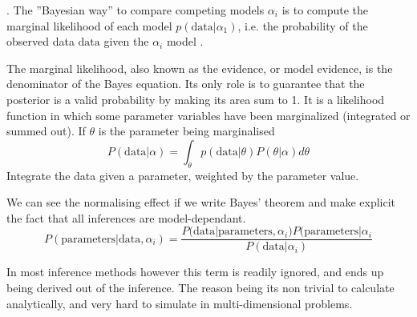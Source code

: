 .
The ''Bayesian way'' to compare competing models $\alpha_i$ is to compute the marginal likelihood of each model $p(\textrm{data}|\alpha_1)$, i.e. the probability of the observed data $\textrm{data}$ given the $\alpha_i$ model \cite{PyMC3marglikeli2019}.

The marginal likelihood, also known as the evidence, or model evidence, is the denominator of the Bayes equation. Its only role is to guarantee that the posterior is a valid probability by making its area sum to 1. It is a likelihood function in which some parameter variables have been marginalized (integrated or summed out). 
If $\theta$ is the parameter being marginalised 
\begin{equation}
P(\textrm{data}|\alpha) = \int_\theta p(\textrm{data}|\theta)P(\theta|\alpha)d\theta
\end{equation}
Integrate the data given a parameter, weighted by the parameter value.

We can see the normalising effect if we write Bayes' theorem and make explicit the fact that all inferences are model-dependant.
\begin{equation*}
    P(\textrm{parameters}|\textrm{data},\alpha_i) = 
    \frac{P(\textrm{data}|\textrm{parameters},\alpha_i)P(\textrm{parameters}|\alpha_i} {P(\textrm{data}|\alpha_i)}
\end{equation*}

In most inference methods however this term is readily ignored, and ends up being derived out of the inference. The reason being its non trivial to calculate analytically, and very hard to simulate in multi-dimensional problems.


